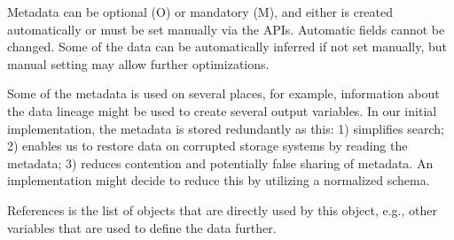 \documentclass{../../template/esiwace-report}
\begin{document}
Metadata can be optional (O) or mandatory (M), and either is created automatically or must be set manually via the APIs.
Automatic fields cannot be changed.
Some of the data can be automatically inferred if not set manually, but manual setting may allow further optimizations.

Some of the metadata is used on several places, for example, information about the data lineage might be used to create several output variables.
In our initial implementation, the metadata is stored redundantly as this: 
1) simplifies search; 2) enables us to restore data on corrupted storage systems by reading the metadata; 3) reduces contention and potentially false sharing of metadata.
An implementation might decide to reduce this by utilizing a normalized schema.

References is the list of objects that are directly used by this object, e.g., other variables that are used to define the data further.
\end{document}
